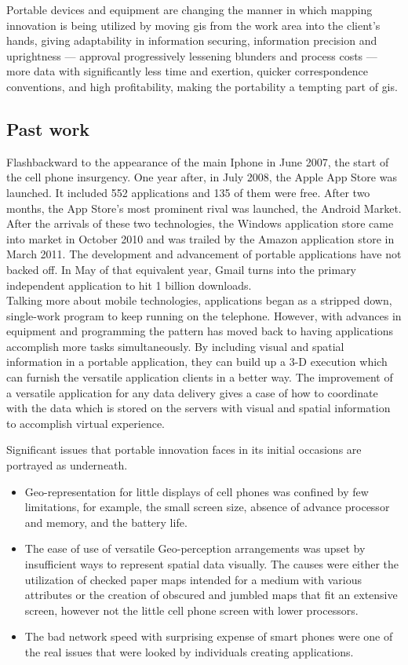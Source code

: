 Portable devices and equipment are changing the manner in which mapping innovation is being utilized by moving \gls{gis} from the work area into the client's hands, giving adaptability in information securing, information precision and uprightness — approval progressively lessening blunders and process costs — more data with significantly less time and exertion, quicker correspondence conventions, and high profitability, making the portability a tempting part of \gls{gis}.

\subsection{Past work}

Flashbackward to the appearance of the main Iphone in June 2007, the start of the cell phone insurgency. One year after, in July 2008, the Apple App Store was launched. It included 552 applications and 135 of them were free. After two months, the App Store's most prominent rival was launched, the Android Market. After the arrivals of these two technologies, the Windows application store came into market in October 2010 and was trailed by the Amazon application store in March 2011. The development and advancement of portable applications have not backed off. In May of that equivalent year, Gmail turns into the primary independent application to hit 1 billion downloads. \\
Talking more about mobile technologies, applications began as a stripped down, single-work program to keep running on the telephone. However, with advances in equipment and programming the pattern has moved back to having applications accomplish more tasks simultaneously. By including visual and spatial information in a portable application, they can build up a 3-D execution which can furnish the versatile application clients in a better way. The improvement of a versatile application for any data delivery gives a case of how to coordinate with the data which is stored on the servers with visual and spatial information to accomplish virtual experience.

Significant issues that portable innovation faces in its initial occasions are portrayed as underneath.

\begin{itemize}
  \item Geo-representation for little displays of cell phones was confined by few limitations, for example, the small screen size, absence of advance processor and memory, and the battery life.
  
  \item The ease of use of versatile Geo-perception arrangements was upset by insufficient ways to represent spatial data visually. The causes were either the utilization of checked paper maps intended for a medium with various attributes or the creation of obscured and jumbled maps that fit an extensive screen, however not the little cell phone screen with lower processors.
  
  \item The bad network speed with surprising expense of smart phones were one of the real issues that were looked by individuals creating applications.
\end{itemize}

